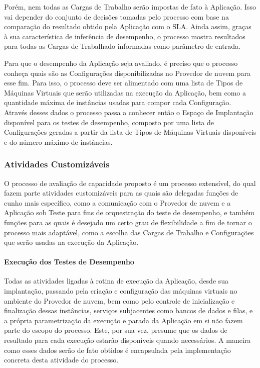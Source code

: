 \documentclass[12pt]{article}
\begin{document}
Porém,
nem todas as Cargas de Trabalho serão impostas de fato à Aplicação. Isso vai 
depender do conjunto de decisões tomadas pelo processo com base na comparação do 
resultado obtido pela Aplicação com o SLA. Ainda assim, graças à sua característica 
de inferência de desempenho, o processo mostra resultados para todas as Cargas de 
Trabalhado informadas como parâmetro de entrada.

Para que o desempenho da Aplicação seja avaliado, é preciso que o processo conheça 
quais são as Configurações disponibilizadas no Provedor de nuvem para esse fim. 
Para isso, o processo deve ser alimentado com uma lista de Tipos de Máquinas Virtuais 
que serão utilizadas na execução da Aplicação, bem como a quantidade máxima de 
instâncias usadas para compor cada Configuração. Através desses dados o processo
passa a conhecer então o Espaço de Implantação disponível para os testes de 
desempenho, composto por uma lista de Configurações geradas a partir da lista de
Tipos de Máquinas Virtuais disponíveis e do número máximo de instâncias.

\subsubsection{Atividades Customizáveis}
O processo de avaliação de capacidade proposto é um processo extensível, do qual
fazem parte atividades customizáveis para as quais são delegadas funções de
cunho mais específico, como a comunicação com o Provedor de nuvem e a Aplicação sob Teste
para fins de orquestração do teste de desempenho, e também funções para as quais
é desejado um certo grau de flexibilidade a fim de tornar o processo mais adaptável,
como a escolha das Cargas de Trabalho e Configurações que serão usadas na execução
da Aplicação.

\paragraph{Execução dos Testes de Desempenho}
Todas as atividades ligadas à rotina de execução da Aplicação, desde sua implantação,
passando pela criação e configuração das máquinas virtuais no ambiente do Provedor 
de nuvem, bem como pelo controle de inicialização e finalização dessas instâncias, 
serviços subjacentes como bancos de dados e filas, e a própria parametrização da 
execução e parada da Aplicação em si não fazem parte do escopo do processo. Este,
por sua vez, presume que os dados de resultado para cada execução estarão disponíveis
quando necessários. A maneira como esses dados serão de fato obtidos é
encapsulada pela implementação concreta desta atividade do processo.
\end{document}
